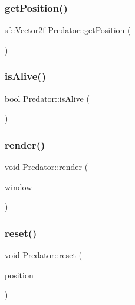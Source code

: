 \mbox{\label{class_predator_aedebee8eb0a1f05ae209a44a014b3e97}} 
\subsubsection{\texorpdfstring{getPosition()}{getPosition()}}
{\footnotesize\ttfamily sf\+::\+Vector2f Predator\+::get\+Position (\begin{DoxyParamCaption}{ }\end{DoxyParamCaption})}

\mbox{\label{class_predator_a122ff47e06dce6c782a4ea66b85e5566}} 
\subsubsection{\texorpdfstring{isAlive()}{isAlive()}}
{\footnotesize\ttfamily bool Predator\+::is\+Alive (\begin{DoxyParamCaption}{ }\end{DoxyParamCaption})}

\mbox{\label{class_predator_acf84bdda5a2ad7120ae182fbeac59516}} 
\subsubsection{\texorpdfstring{render()}{render()}}
{\footnotesize\ttfamily void Predator\+::render (\begin{DoxyParamCaption}\item[{sf\+::\+Render\+Window \&}]{window }\end{DoxyParamCaption})}

\mbox{\label{class_predator_a596b6e0c600560d7c3dc1bb0bf063f87}} 
\subsubsection{\texorpdfstring{reset()}{reset()}}
{\footnotesize\ttfamily void Predator\+::reset (\begin{DoxyParamCaption}\item[{sf\+::\+Vector2f}]{position }\end{DoxyParamCaption})}

